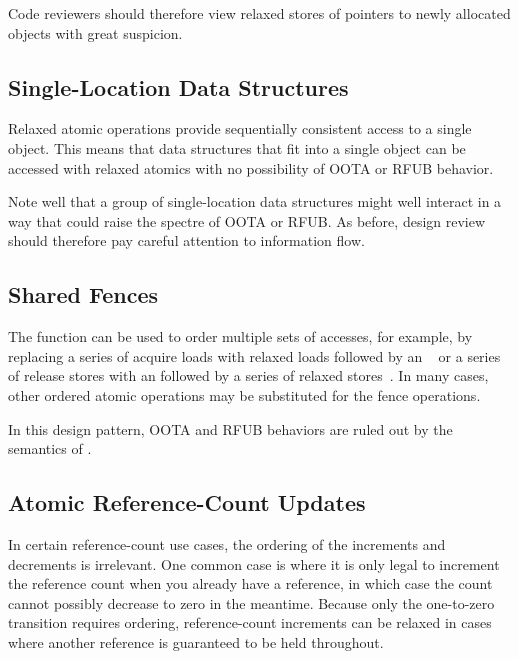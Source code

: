 \documentclass[10]{article}
\begin{document}
Code reviewers should therefore view relaxed stores of pointers to
newly allocated objects with great suspicion.

\subsection{Single-Location Data Structures}
\label{sec:Single-Location Data Structures}

Relaxed atomic operations provide sequentially consistent access to
a single object.
This means that data structures that fit into a single object can
be accessed with relaxed atomics with no possibility of OOTA or
RFUB behavior.

Note well that a group of single-location data structures might well
interact in a way that could raise the spectre of OOTA or RFUB.
As before, design review should therefore pay careful attention to
information flow.

\subsection{Shared Fences}
\label{sec:Shared Fences}

The  function can be used to order
multiple sets of accesses, for example, by replacing a series of
acquire loads with relaxed loads followed by an
~\cite[Section 4.1]{RaulSilvera2007WeakMemoryModel}
or a series of release stores with an
 followed by
a series of relaxed stores~\cite[Section 4.2]{RaulSilvera2007WeakMemoryModel}.
In many cases, other ordered atomic operations may be substituted for
the fence operations.

In this design pattern, OOTA and RFUB behaviors are ruled out by the semantics
of .

\subsection{Atomic Reference-Count Updates}
\label{sec:Atomic Reference-Count Updates}

In certain reference-count use cases, the ordering of the increments and
decrements is irrelevant.
One common case is where it is only legal to increment the reference
count when you already have a reference, in which case the count cannot
possibly decrease to zero in the meantime.
Because only the one-to-zero transition requires ordering, reference-count
increments can be relaxed in cases where another reference is guaranteed
to be held throughout.
\end{document}
